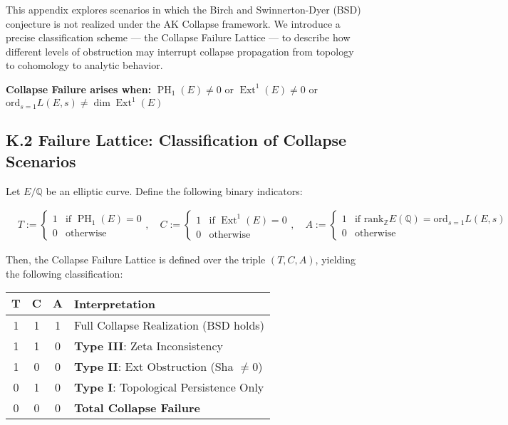 \documentclass[11pt]{article}
\DeclareMathOperator{\Ext}{Ext}
\DeclareMathOperator{\PH}{PH}
\newcommand{\QQ}{\mathbb{Q}}
\newcommand{\ZZ}{\mathbb{Z}}
\begin{document}
This appendix explores scenarios in which the Birch and Swinnerton-Dyer (BSD) conjecture is not realized under the AK Collapse framework.  
We introduce a precise classification scheme — the Collapse Failure Lattice — to describe how different levels of obstruction may interrupt collapse propagation from topology to cohomology to analytic behavior.

\begin{center}
\textbf{Collapse Failure arises when:}  
$\PH_1(E) \neq 0$ or $\Ext^1(E) \neq 0$ or $\mathrm{ord}_{s=1} L(E,s) \neq \dim \Ext^1(E)$
\end{center}

\subsection*{K.2 Failure Lattice: Classification of Collapse Scenarios}

Let $E/\QQ$ be an elliptic curve. Define the following binary indicators:

\[
\begin{aligned}
& T := \begin{cases}
1 & \text{if } \PH_1(E) = 0 \\
0 & \text{otherwise}
\end{cases}, \quad
C := \begin{cases}
1 & \text{if } \Ext^1(E) = 0 \\
0 & \text{otherwise}
\end{cases}, \quad
A := \begin{cases}
1 & \text{if } \mathrm{rank}_{\ZZ} E(\QQ) = \mathrm{ord}_{s=1} L(E,s) \\
0 & \text{otherwise}
\end{cases}
\end{aligned}
\]

Then, the Collapse Failure Lattice is defined over the triple $(T, C, A)$, yielding the following classification:

\begin{center}
\begin{tabular}{|c|c|c|l|}
\hline
$\mathbf{T}$ & $\mathbf{C}$ & $\mathbf{A}$ & \textbf{Interpretation} \\
\hline
1 & 1 & 1 & Full Collapse Realization (BSD holds) \\
\hline
1 & 1 & 0 & \textbf{Type III}: Zeta Inconsistency \\
1 & 0 & 0 & \textbf{Type II}: Ext Obstruction (Sha $\neq 0$) \\
0 & 1 & 0 & \textbf{Type I}: Topological Persistence Only \\
0 & 0 & 0 & \textbf{Total Collapse Failure} \\
\hline
\end{tabular}
\end{center}
\end{document}
